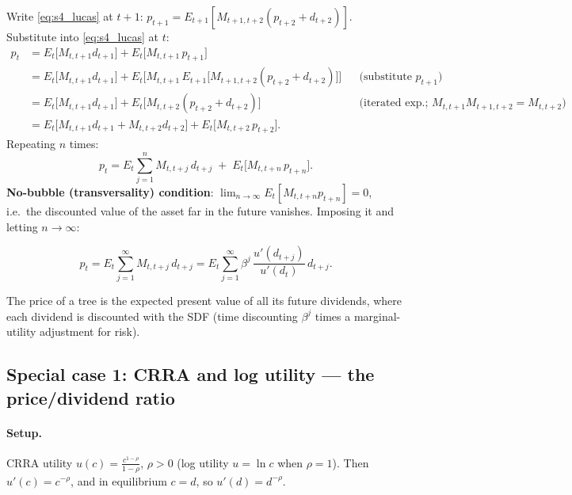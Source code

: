 Write \eqref{eq:s4_lucas} at $t+1$: $p_{t+1}=E_{t+1}[M_{t+1,t+2}(p_{t+2}+d_{t+2})]$. Substitute into \eqref{eq:s4_lucas} at $t$:
\begin{align*}
  p_t &= E_t\big[M_{t,t+1}d_{t+1}\big] + E_t\big[M_{t,t+1}\,p_{t+1}\big]\\
  &= E_t\big[M_{t,t+1}d_{t+1}\big] + E_t\Big[M_{t,t+1}\,E_{t+1}\big[M_{t+1,t+2}(p_{t+2}+d_{t+2})\big]\Big]
     && \text{(substitute $p_{t+1}$)}\\
  &= E_t\big[M_{t,t+1}d_{t+1}\big] + E_t\big[M_{t,t+2}(p_{t+2}+d_{t+2})\big]
     && \text{(iterated exp.; $M_{t,t+1}M_{t+1,t+2}=M_{t,t+2}$)}\\
  &= E_t\big[M_{t,t+1}d_{t+1}+M_{t,t+2}d_{t+2}\big] + E_t\big[M_{t,t+2}\,p_{t+2}\big].
\end{align*}
Repeating $n$ times:
\begin{equation}\label{eq:s4_iter}
  p_t = E_t\sum_{j=1}^{n} M_{t,t+j}\,d_{t+j} \;+\; E_t\big[M_{t,t+n}\,p_{t+n}\big].
\end{equation}
\textbf{No-bubble (transversality) condition}: $\lim_{n\to\infty}E_t[M_{t,t+n}p_{t+n}] = 0$, i.e.\ the discounted value of the asset far in the future vanishes. Imposing it and letting $n\to\infty$:
\begin{keybox}[title=Fundamental value]
\begin{equation}\label{eq:s4_pv}
  p_t = E_t\sum_{j=1}^{\infty} M_{t,t+j}\,d_{t+j}
      = E_t\sum_{j=1}^{\infty} \beta^j\,\frac{u'(d_{t+j})}{u'(d_t)}\,d_{t+j}.
\end{equation}
\end{keybox}
The price of a tree is the expected present value of all its future dividends, where each dividend is discounted with the SDF (time discounting $\beta^j$ times a marginal-utility adjustment for risk).

\subsection{Special case 1: CRRA and log utility --- the price/dividend ratio }

\paragraph{Setup.} CRRA utility $u(c)=\frac{c^{1-\rho}}{1-\rho}$, $\rho>0$ (log utility $u=\ln c$ when $\rho=1$). Then $u'(c)=c^{-\rho}$, and in equilibrium $c=d$, so $u'(d)=d^{-\rho}$.

